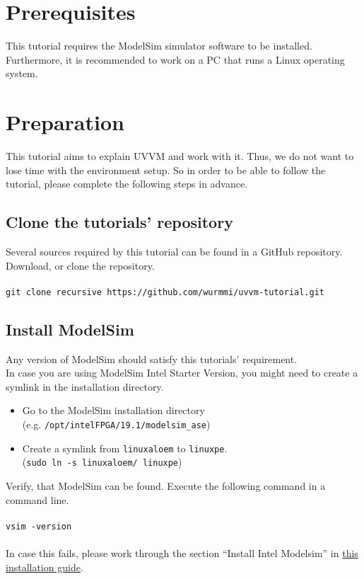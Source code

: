\section{Prerequisites}

This tutorial requires the ModelSim simulator software to be installed.
Furthermore, it is recommended to work on a PC that runs a Linux operating system.

\section{Preparation}

This tutorial aims to explain UVVM and work with it.
Thus, we do not want to lose time with the environment setup.
So in order to be able to follow the tutorial, please complete the
following steps in advance.

\subsection{Clone the tutorials' repository}

Several sources required by this tutorial can be found in a GitHub repository.\\
Download, or clone the repository.\\
\\
\texttt{git clone \textendash \textendash recursive https://github.com/wurmmi/uvvm-tutorial.git }

\subsection{Install ModelSim}

Any version of ModelSim should satisfy this tutorials' requirement.\\

In case you are using ModelSim Intel Starter Version, you might need to
create a symlink in the installation directory.
\begin{itemize}
  \item Go to the ModelSim installation directory\\
        (e.g. \texttt{/opt/intelFPGA/19.1/modelsim\_ase})
  \item Create a symlink from \texttt{linuxaloem} to \texttt{linuxpe}.\\
        (\texttt{sudo ln -s linuxaloem/ linuxpe})
\end{itemize}

Verify, that ModelSim can be found. Execute the following command in a command line.\\
\\
\texttt{vsim -version}\\
\\
In case this fails, please work through the section ``Install Intel Modelsim''
in \href{../install-modelsim-on-ubuntu.pdf}{this installation guide}.

